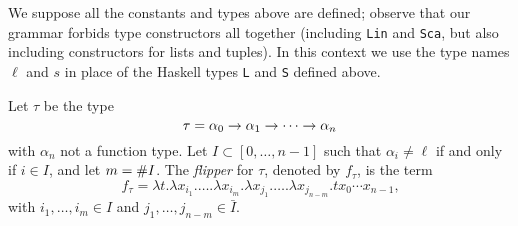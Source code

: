 We suppose all the constants and types above are defined; observe that
our grammar forbids type constructors all together (including
\lstinline{Lin} and \lstinline{Sca}, but also including constructors for
lists and tuples). In this context we use the type names $\ell$ and
$s$ in place of the Haskell types \lstinline{L} and \lstinline{S}
defined above.

\begin{definition}[Flipper]
  Let $\tau$ be the type
  \begin{equation}
    \label{eq:58}
    \tau = \alpha_0\rightarrow\alpha_1\rightarrow\cdots\rightarrow\alpha_n
  \end{equation}
  with $\alpha_n$ not a function type. Let $I\subset[0,\ldots,n-1]$
  such that $\alpha_i\ne\ell$ if and only if $i\in I$, and let
  $m=\# I$.  The \emph{flipper} for $\tau$, denoted by $f_\tau$,
  is the term
  \begin{equation}
    \label{eq:60}
    f_\tau = \lambda t.\lambda x_{i_1}.\ldots.\lambda x_{i_m}.
    \lambda x_{j_1}.\ldots.\lambda x_{j_{n-m}}.tx_0\cdots x_{n-1}
    \text{,}
  \end{equation}
  with $i_1,\ldots,i_m\in I$ and $j_1,\ldots,j_{n-m}\in\bar{I}$.
\end{definition}


